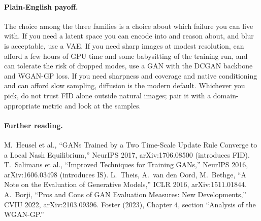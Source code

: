 \documentclass[11pt]{article}
\theoremstyle{remark}
\begin{document}
\paragraph{Plain-English payoff.}
The choice among the three families is a choice about which failure you can live with. If you need a latent space you can encode into and reason about, and blur is acceptable, use a VAE. If you need sharp images at modest resolution, can afford a few hours of GPU time and some babysitting of the training run, and can tolerate the risk of dropped modes, use a GAN with the DCGAN backbone and WGAN-GP loss. If you need sharpness and coverage and native conditioning and can afford slow sampling, diffusion is the modern default. Whichever you pick, do not trust FID alone outside natural images; pair it with a domain-appropriate metric and look at the samples.

\paragraph{Further reading.}\begingroup\sloppy
M.\ Heusel et al., ``GANs Trained by a Two Time-Scale Update Rule Converge to a Local Nash Equilibrium,'' NeurIPS 2017, arXiv:1706.08500 (introduces FID). T.\ Salimans et al., ``Improved Techniques for Training GANs,'' NeurIPS 2016, arXiv:1606.03498 (introduces IS). L.\ Theis, A.\ van den Oord, M.\ Bethge, ``A Note on the Evaluation of Generative Models,'' ICLR 2016, arXiv:1511.01844. A.\ Borji, ``Pros and Cons of GAN Evaluation Measures: New Developments,'' CVIU 2022, arXiv:2103.09396. Foster (2023), Chapter 4, section ``Analysis of the WGAN-GP.''
\endgroup
\end{document}
